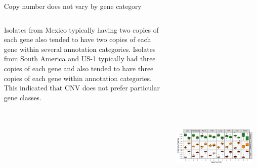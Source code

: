 
\begin{columns}[t]
  \begin{column}{0.54\textwidth}
    \begin{block}{\large Copy number does not vary by gene category}

      \begin{columns}
        \begin{column}{0.5\textwidth}
\scriptsize
\vspace{5mm}

Isolates from Mexico typically having two copies of each gene also tended to have two copies of each gene within several annotation categories.
Isolates from South America and US-1 typically had three copies of each gene and also tended to have three copies of each gene within annotation categories.
This indicated that CNV does not prefer particular gene classes.
        \end{column}
        \begin{column}{0.45\textwidth}

          \includegraphics[height=13cm]{./figures/Fig5_gene_cnv.png}


\end{column}
\end{columns}
\end{block}
\end{column}
\end{columns}
